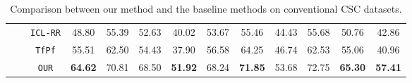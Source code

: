 \begin{table*}[tb!]
{\begin{NiceTabular}{lccccccccc;c;c|>{}c}
                                                                                            &                               & \texttt{ICL-RR}                 & 48.80                                              & 55.39          & 52.63          & 40.02          & 53.67          & 55.46          & 44.43          & 55.68                            & 50.76                         & 42.86                  \\
                                                                                            &                               & \texttt{TfPf}                   & 55.51                                              & 62.50          & 54.43          & 37.90          & 56.58          & 64.25          & 46.74          & 62.53                            & 55.06                         & 40.96                  \\
                                                                                            &                               & \texttt{OUR}                    & \textbf{64.62}                                     & 70.81          & 68.50          & \textbf{51.92} & 68.24          & \textbf{71.85} & 53.68          & 72.75                            & \textbf{65.30}                & \textbf{57.41}         \\
            \bottomrule
        \end{NiceTabular}
    }
    \caption{
        Comparison between our method and the baseline methods on conventional CSC datasets.
    }
    \label{tab:main_results}
\end{table*}
